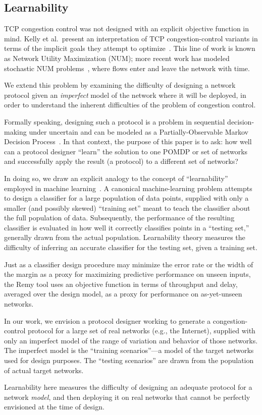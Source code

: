 \subsection{Learnability}

TCP congestion control was not designed with an explicit objective
function in mind. Kelly et al.~present an interpretation of TCP
congestion-control variants in terms of the implicit goals they
attempt to optimize~\cite{Kelly98}.  This line of work is known as
Network Utility Maximization (NUM); more recent work has modeled
stochastic NUM problems~\cite{stochasticnum}, where flows enter and
leave the network with time.

We extend this problem by examining the difficulty of designing a
network protocol given an \emph{imperfect} model of the network where
it will be deployed, in order to understand the inherent difficulties
of the problem of congestion control.

Formally speaking, designing such a protocol is a problem in
sequential decision-making under uncertain and can be modeled as a
Partially-Observable Markov Decision Process~\cite{pomdp}. In that
context, the purpose of this paper is to ask: how well can a protocol
designer ``learn'' the solution to one POMDP or set of networks and
successfully apply the result (a protocol) to a different set of networks?

In doing so, we draw an explicit analogy to the concept of
``learnability'' employed in machine
learning~\cite{learnable,schapire}. A canonical machine-learning
problem attempts to design a classifier for a large population of data
points, supplied with only a smaller (and possibly skewed) ``training
set'' meant to teach the classifier about the full population of
data. Subsequently, the performance of the resulting classifier is
evaluated in how well it correctly classifies points in a ``testing
set,'' generally drawn from the actual population. Learnability theory
measures the difficulty of inferring an accurate classifier for the
testing set, given a training set.

Just as a classifier design procedure may minimize the error rate or
the width of the margin as a proxy for maximizing predictive
performance on unseen inputs, the Remy tool uses an objective function
in terms of throughput and delay, averaged over the design model, as a
proxy for performance on as-yet-unseen networks.

In our work, we envision a protocol designer working to generate a
congestion-control protocol for a large set of real networks (e.g.,
the Internet), supplied with only an imperfect model of the range of
variation and behavior of those networks. The imperfect model is the
``training scenarios''---a model of the target networks used for design
purposes. The ``testing scenarios'' are drawn from the population of actual
target networks.

Learnability here measures the difficulty of designing an adequate
protocol for a network \emph{model}, and then deploying it on real
networks that cannot be perfectly envisioned at the time of design.

